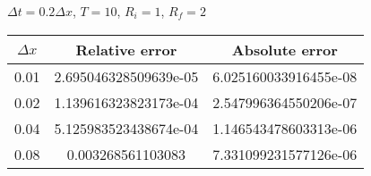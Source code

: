 \documentclass[fleqn,12pt]{siamart1116}
\begin{document}



$\Delta t = 0.2 \Delta x$, $T = 10$, $R_i = 1$, $R_f = 2$
\begin{center}
\begin{tabular}{ |c||c|c| } 
 \hline
 $\Delta x$ & Relative error & Absolute error \\ 
 \hline
 \hline
 0.01 & 2.695046328509639e-05 & 6.025160033916455e-08 \\ 
 \hline 
 0.02 & 1.139616323823173e-04 & 2.547996364550206e-07 \\ 
 \hline
 0.04 & 5.125983523438674e-04 & 1.146543478603313e-06 \\ 
 \hline
 0.08 & 0.003268561103083 & 7.331099231577126e-06 \\ 
 \hline
\end{tabular}
\end{center}
\medskip
\end{document}
